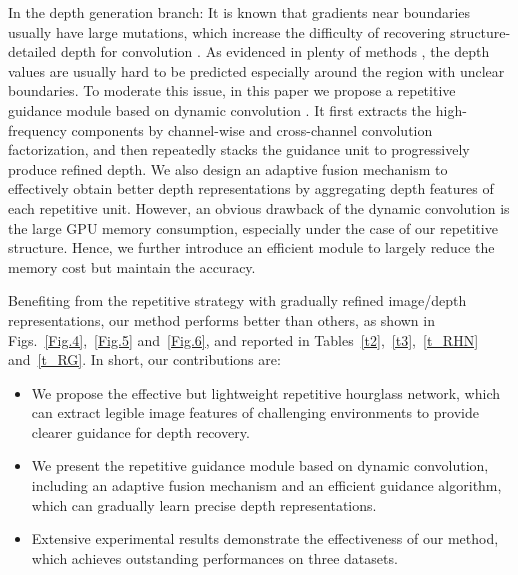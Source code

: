 \documentclass[runningheads]{llncs}
\begin{document}
In the depth generation branch: It is known that gradients near boundaries usually have large mutations, which increase the difficulty of recovering structure-detailed depth for convolution \cite{Uhrig2017THREEDV}. As evidenced in plenty of methods \cite{huang2019indoor,2020Confidence,park2020nonlocal},  the depth values are usually hard to be predicted especially around the region with unclear boundaries. To moderate this issue, in this paper we propose a repetitive guidance module based on dynamic convolution \cite{tang2020learning}. It first extracts the high-frequency components by channel-wise and cross-channel convolution factorization, and then repeatedly stacks the guidance unit to progressively produce refined depth. We also design an adaptive fusion mechanism to effectively obtain better depth representations by aggregating depth features of each repetitive unit. However, an obvious drawback of the dynamic convolution is the large GPU memory consumption, especially under the case of our repetitive structure. Hence, we further introduce an efficient module to largely reduce the memory cost but maintain the accuracy.

Benefiting from the repetitive strategy with gradually refined image/depth representations, our method performs better than others, as shown in Figs.~\ref{Fig.4},~\ref{Fig.5} and~\ref{Fig.6}, and reported in Tables~\ref{t2},~\ref{t3},~\ref{t_RHN} and~\ref{t_RG}. In short, our contributions are:
\begin{itemize}
    \item We propose the effective but lightweight repetitive hourglass network, which can extract legible image features of challenging environments to provide clearer guidance for depth recovery.
    \item We present the repetitive guidance module based on dynamic convolution, including an adaptive fusion mechanism and an efficient guidance algorithm, which can gradually learn precise depth representations.
    \item Extensive experimental results demonstrate the effectiveness of our method, which achieves outstanding performances on three datasets.
\end{itemize}
\end{document}
